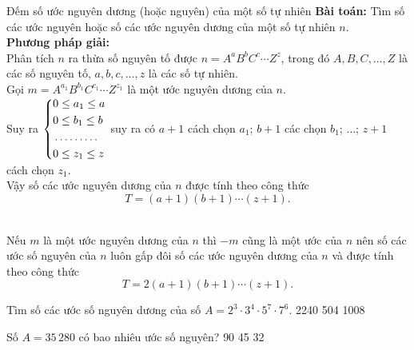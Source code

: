 \begin{dang}{Đếm số ước nguyên dương (hoặc nguyên) của một số tự nhiên}
\textbf{Bài toán:} Tìm số các ước nguyên hoặc số các ước nguyên dương của một số tự nhiên $n$.\\
\textbf{Phương pháp giải:}\\
Phân tích $n$ ra thừa số nguyên tố được $n=A^a B^b C^c\cdots Z^z$, trong đó $A,B,C,\ldots , Z$ là các số nguyên tố, $a,b,c,\ldots ,z$ là các số tự nhiên.\\
Gọi $m=A^{a_1} B^{b_1} C^{c_1}\cdots Z^{z_1}$ là một ước nguyên dương của $n$.\\
Suy ra $\left\{\begin{aligned}& 0\le a_1 \le a\\ & 0\le b_1 \le b\\& \ldots \ldots\ldots \\& 0\le z_1\le z\end{aligned}\right.$ suy ra có $a+1$ cách chọn $a_1$; $b+1$ các chọn $b_1$; $\ldots$; $z+1$ cách chọn $z_1$.\\
Vậy số các ước nguyên dương của $n$ được tính theo công thức $$T=(a+1)(b+1)\cdots (z+1).$$\\
\begin{note}
Nếu $m$ là một ước nguyên dương của $n$ thì $-m$ cũng là một ước của $n$ nên số các ước số nguyên của $n$ luôn gấp đôi số các ước nguyên dương của $n$ và được tính theo công thức $$T=2(a+1)(b+1)\cdots (z+1).$$
\end{note}
\end{dang}
\begin{vd}%
Tìm số các ước số nguyên dương của số $A=2^3\cdot 3^4 \cdot 5^7 \cdot 7^6$.
\choice
{2240}
{504}
{}
{1008}
\end{vd}
\begin{vd}%
Số $A=35\, 280$ có bao nhiêu ước số nguyên?
\choice
{}
{90}
{45}
{32}
\end{vd}

